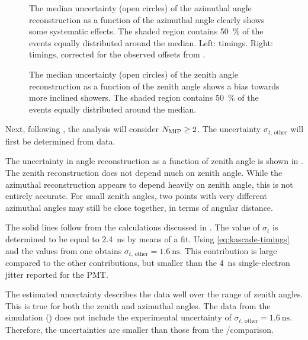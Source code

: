\begin{figure}
\centering
{


}
\caption{The median uncertainty (open circles) of the azimuthal angle
reconstruction as a function of the azimuthal angle clearly shows some
systematic effects.  
The shaded region contains \SI{50}{\percent} of the events equally
distributed around the median.
Left:  timings.  Right:  timings,
corrected for the observed offsets from .}
\label{fig:results-bin-phi}
\end{figure}

\begin{figure}
\centering

\caption{The median uncertainty (open circles) of the zenith angle
reconstruction as a function of the zenith angle shows a bias towards more
inclined showers.  The shaded region contains \SI{50}{\percent} of the
events equally distributed around the median.
}
\label{fig:results-bin-theta}
\end{figure}

Next, following , the analysis will consider
$N_\mathrm{\mip} \geq 2$. The uncertainty $\sigma_{t,\, \mathrm{other}}$
will first be determined from data. 

The uncertainty in angle reconstruction as a function of zenith angle is shown
in .  The zenith reconstruction does not depend much
on zenith angle.  While the azimuthal reconstruction appears to depend heavily
on zenith angle, this is not entirely accurate.  For small zenith angles, two
points with very different azimuthal angles may still be close together, in
terms of angular distance. 

The solid lines follow from the calculations discussed in
. The value of $\sigma_t$ is
determined to be equal to \SI{2.4}{\nano\second} by means of a fit.  Using
\eqref{eq:kascade-timings} and the values from
one obtains $\sigma_{t,\, \mathrm{other}} = \SI{1.6}{\nano\second}$. This
contribution is large compared to the other contributions, but smaller
than the \SI{4}{\nano\second} single-electron jitter reported for the PMT.

The estimated uncertainty describes the data well over the range of zenith
angles. This is true for both the zenith and azimuthal angles. The data
from the simulation () does not include the
experimental uncertainty of $\sigma_{t,\,\mathrm{other}} =
\SI{1.6}{\nano\second}$.  Therefore, the uncertainties are smaller than
those from the \hisparc/\kascade comparison.

